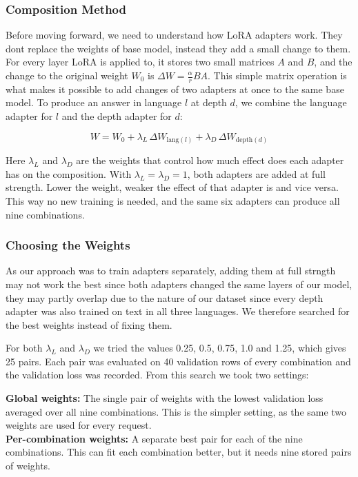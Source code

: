 \documentclass{FastFyp}
\begin{document}
\subsubsection{Composition Method}
Before moving forward, we need to understand how LoRA adapters work. They dont replace the weights of base model, instead they add a small change to them. For every layer LoRA is applied to, it stores two small matrices $A$ and $B$, and the change to the original weight $W_0$ is $\Delta W = \frac{\alpha}{r} B A$. This simple matrix operation is what makes it possible to add changes of two adapters at once to the same base model. To produce an answer in language $l$ at depth $d$, we combine the language adapter for $l$ and the depth adapter for $d$:

\begin{equation}
W = W_0 + \lambda_L \, \Delta W_{\mathrm{lang}(l)} + \lambda_D \, \Delta W_{\mathrm{depth}(d)}
\label{eq:composition}
\end{equation}

Here $\lambda_L$ and $\lambda_D$ are the weights that control how much effect does each adapter has on the composition. With $\lambda_L = \lambda_D = 1$, both adapters are added at full strength. Lower the weight, weaker the effect of that adapter is and vice versa. This way no new training is needed, and the same six adapters can produce all nine combinations.

\subsubsection{Choosing the Weights}
As our approach was to train adapters separately, adding them at full strngth may not work the best since both adapters changed the same layers of our model, they may partly overlap due to the nature of our dataset since every depth adapter was also trained on text in all three languages. We therefore searched for the best weights instead of fixing them.

For both $\lambda_L$ and $\lambda_D$ we tried the values 0.25, 0.5, 0.75, 1.0 and 1.25, which gives 25 pairs. Each pair was evaluated on 40 validation rows of every combination and the validation loss was recorded. From this search we took two settings:

\textbf{Global weights:} The single pair of weights with the lowest validation loss averaged over all nine combinations. This is the simpler setting, as the same two weights are used for every request.\\
\textbf{Per-combination weights:} A separate best pair for each of the nine combinations. This can fit each combination better, but it needs nine stored pairs of weights.
\end{document}
